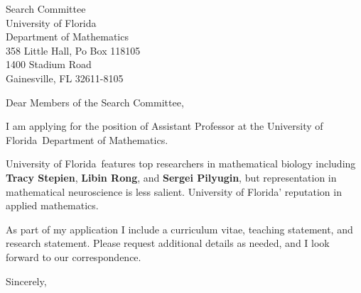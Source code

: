 \documentclass[11pt,a4paper]{letter}
\begin{document}

\def\School{University of Florida}

\begin{letter}
{Search Committee\\
University of Florida\\
Department of Mathematics\\
358 Little Hall, Po Box 118105\\
1400 Stadium Road\\
Gainesville, FL 32611-8105}


\opening{Dear Members of the Search Committee,}

I am applying for the position of Assistant Professor at the \School~Department of Mathematics. 



\School~features top researchers in mathematical biology including \textbf{Tracy Stepien}, \textbf{Libin Rong}, and \textbf{Sergei Pilyugin}, but representation in mathematical neuroscience is less salient. \School' reputation in applied mathematics.



As part of my application I include a curriculum vitae, teaching statement, and research statement. Please request additional details as needed, and I look forward to our correspondence.

\closing{Sincerely,}
\end{letter}
\end{document}
